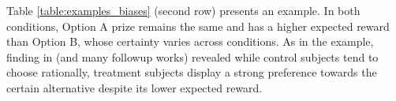 Table \ref{table:examples_biases} (second row) presents an example.
In both conditions, Option A prize remains the same and has a higher expected reward than Option B,
whose certainty varies across conditions.
As in the example,
finding in \citet{kahneman1979prospect} (and many followup works)
revealed while control subjects tend to choose rationally,
treatment subjects display a strong preference towards the certain alternative despite its lower expected reward.







